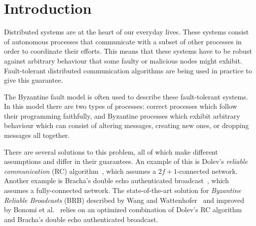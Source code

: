 \section{Introduction}








Distributed systems are at the heart of our everyday lives. These systems consist of autonomous processes that communicate with a subset of other processes in order to coordinate their efforts. This means that these systems have to be robust against arbitrary behaviour that some faulty or malicious nodes might exhibit. Fault-tolerant distributed communication algorithms are being used in practice to give this guarantee. 

The Byzantine fault model is often used to describe these fault-tolerant systems. In this model there are two types of processes: correct processes which follow their programming faithfully, and Byzantine processes which exhibit arbitrary behaviour which can consist of altering messages, creating new ones, or dropping messages all together.

There are several solutions to this problem, all of which make different assumptions and differ in their guarantees. An example of this is Dolev's \textit{reliable communication} (RC) algorithm~\cite{dolev}, which assumes a $2f+1$-connected network. Another example is Bracha's double echo authenticated broadcast~\cite{bracha}, which assumes a fully-connected network. The state-of-the-art solution for \textit{Byzantine Reliable Broadcasts} (BRB) described by Wang and Wattenhofer~\cite{bracha-dolev} and improved by Bonomi et al.~\cite{bonomi2021practical} relies on an optimized combination of Dolev's RC algorithm~\cite{bonomi2019multihop} and Bracha's double echo authenticated broadcast.

